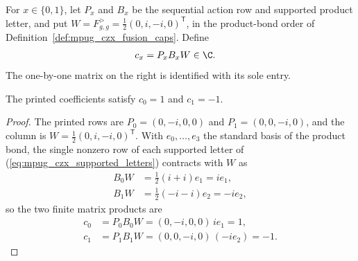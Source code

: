 \begin{definition}
    \label{def:mpug_czx_fusion_action_coefficient}
    \leanok
    For $x\in\{0,1\}$, let $P_x$ and $B_x$ be the sequential action row
    and supported product letter, and put
    $W=F^>_{g,g}=\tfrac12(0,i,-i,0)^{\mathsf T}$, in the product-bond
    order of Definition~\ref{def:mpug_czx_fusion_caps}. Define
    \begin{align}
        c_x & =P_xB_xW\in\C.
    \end{align}
    The one-by-one matrix on the right is identified with its sole entry.
\end{definition}

\begin{lemma}
    \label{thm:mpug_czx_fusion_action_coefficient_coordinates}
    \leanok
    The printed coefficients satisfy $c_0=1$ and $c_1=-1$.
\end{lemma}
\begin{proof}\leanok
    The printed rows are $P_0=(0,-i,0,0)$ and $P_1=(0,0,-i,0)$, and the
    column is $W=\tfrac12(0,i,-i,0)^{\mathsf T}$. With $e_0,\dots,e_3$ the
    standard basis of the product bond, the single nonzero row of each
    supported letter of (\ref{eq:mpug_czx_supported_letters}) contracts with
    $W$ as
    \begin{align}
        B_0W & =\tfrac12(i+i)e_1=ie_1,   \\
        B_1W & =\tfrac12(-i-i)e_2=-ie_2,
    \end{align}
    so the two finite matrix products are
    \begin{align}
        c_0 & =P_0B_0W=(0,-i,0,0)\,ie_1=1,     \\
        c_1 & =P_1B_1W=(0,0,-i,0)\,(-ie_2)=-1.
    \end{align}
\end{proof}

